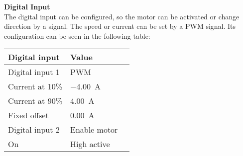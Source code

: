 \textbf{Digital Input}\\
The digital input can be configured, so the motor can be activated or change direction by a signal. The speed or current can be set by a PWM signal. Its configuration can be seen in the following table:
\begin{table}[H]
	\centering
	\begin{tabular}{|l|l|p{4.3cm}|}
		\hline%
		\textbf{Digital input}       &  \textbf{Value}         \\
		\hline%
		Digital input 1                                & PWM           \\
		\hline%
		Current at 10\%							  & \SI{-4,00}{A}              \\
		\hline%
		Current at 90\%							  & \SI{4,00}{A}              \\
		\hline%
		Fixed offset							  & \SI{0,00}{A}              \\
		\hline%
		Digital input 2                                & Enable motor           \\
		\hline%
		On     &  High active       \\
		\hline%
	\end{tabular}
\end{table}

